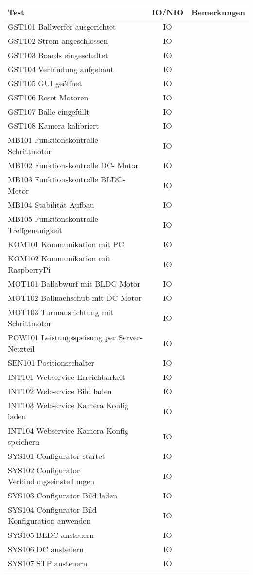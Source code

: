\begin{table}[h!]
	\centering
	\renewcommand{\arraystretch}{1.5}
	\begin{tabular}{|l|c|p{8cm}|}
		\hline \textbf{Test} & \textbf{IO/NIO} & \textbf{Bemerkungen} \\
		\hline GST101 Ballwerfer ausgerichtet & IO & \\
		\hline GST102 Strom angeschlossen & IO & \\
		\hline GST103 Boards eingeschaltet & IO & \\
		\hline GST104 Verbindung aufgebaut & IO & \\
		\hline GST105 GUI geöffnet & IO & \\
		\hline GST106 Reset Motoren & IO & \\
		\hline GST107 Bälle eingefüllt & IO & \\
		\hline GST108 Kamera kalibriert & IO & \\
		\hline MB101 Funktionskontrolle Schrittmotor & IO & \\
		\hline MB102 Funktionskontrolle DC- Motor & IO & \\
		\hline MB103 Funktionskontrolle BLDC- Motor & IO & \\
		\hline MB104 Stabilität Aufbau & IO & \\
		\hline MB105 Funktionskontrolle Treffgenauigkeit & IO & \\
		\hline KOM101 Kommunikation mit PC & IO & \\
		\hline KOM102 Kommunikation mit RaspberryPi & IO & \\
		\hline MOT101 Ballabwurf mit BLDC Motor & IO & \\
		\hline MOT102 Ballnachschub mit DC Motor & IO & \\
		\hline MOT103 Turmausrichtung mit Schrittmotor & IO & \\
		\hline POW101 Leistungsspeisung per Server-Netzteil & IO & \\
		\hline SEN101 Positionsschalter & IO & \\
		\hline INT101 Webservice Erreichbarkeit & IO & \\
		\hline INT102 Webservice Bild laden & IO & \\
		\hline INT103 Webservice Kamera Konfig laden & IO & \\
		\hline INT104 Webservice Kamera Konfig speichern & IO & \\
		\hline SYS101 Configurator startet & IO & \\
		\hline SYS102 Configurator Verbindungseinstellungen & IO & \\
		\hline SYS103 Configurator Bild laden & IO & \\
		\hline SYS104 Configurator Bild Konfiguration anwenden & IO & \\
		\hline SYS105 BLDC ansteuern & IO & \\
		\hline SYS106 DC ansteuern & IO & \\
		\hline SYS107 STP ansteuern & IO & \\
		\hline 
	\end{tabular}
\end{table}